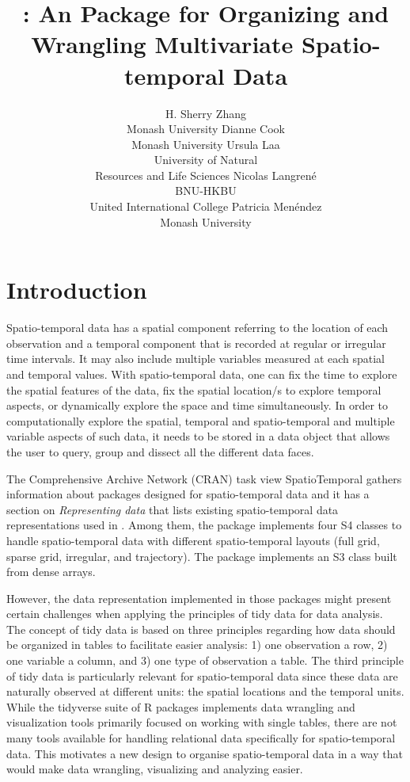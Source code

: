 \documentclass[
  shortnames]{jss}
\author{
H. Sherry Zhang\\Monash University \And Dianne Cook\\Monash University \And Ursula Laa\\University of Natural \\ Resources and Life Sciences \AND Nicolas Langrené\\BNU-HKBU \\ United International College \And Patricia Menéndez\\Monash University
}
\title{\pkg{cubble}: An \proglang{R} Package for Organizing and Wrangling Multivariate Spatio-temporal Data}
\begin{document}
\hypertarget{introduction}{%
\section{Introduction}\label{introduction}}

Spatio-temporal data has a spatial component referring to the location of each observation and a temporal component that is recorded at regular or irregular time intervals. It may also include multiple variables measured at each spatial and temporal values. With spatio-temporal data, one can fix the time to explore the spatial features of the data, fix the spatial location/s to explore temporal aspects, or dynamically explore the space and time simultaneously. In order to computationally explore the spatial, temporal and spatio-temporal and multiple variable aspects of such data, it needs to be stored in a data object that allows the user to query, group and dissect all the different data faces.

The Comprehensive  Archive Network (CRAN) task view SpatioTemporal \citep{ctvspatiotemporal} gathers information about  packages designed for spatio-temporal data and it has a section on \emph{Representing data} that lists existing spatio-temporal data representations used in . Among them, the  package \citep{spacetime} implements four S4 classes to handle spatio-temporal data with different spatio-temporal layouts (full grid, sparse grid, irregular, and trajectory). The  package \citep{stars} implements an S3 class built from dense arrays.

However, the data representation implemented in those packages might present certain challenges when applying the principles of tidy data \citep{tidydata} for data analysis. The concept of tidy data is based on three principles regarding how data should be organized in tables to facilitate easier analysis: 1) one observation a row, 2) one variable a column, and 3) one type of observation a table. The third principle of tidy data is particularly relevant for spatio-temporal data since these data are naturally observed at different units: the spatial locations and the temporal units. While the tidyverse suite of R packages implements data wrangling and visualization tools primarily focused on working with single tables, there are not many tools available for handling relational data specifically for spatio-temporal data. This motivates a new design to organise spatio-temporal data in a way that would make data wrangling, visualizing and analyzing easier.
\end{document}
